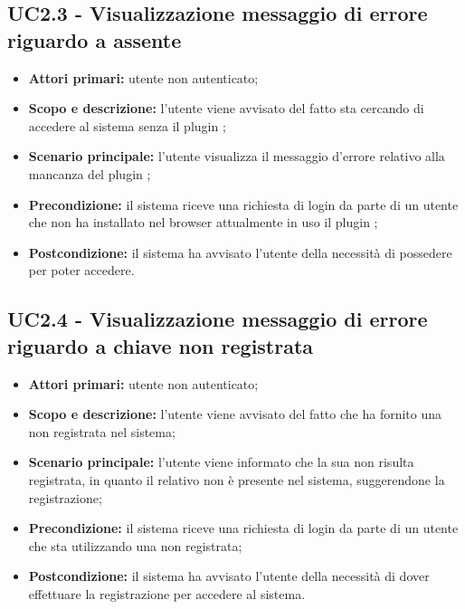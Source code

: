 \documentclass[AnalisiDeiRequisiti.tex]{subfiles}
\begin{document}
\subsection{UC2.3 - Visualizzazione messaggio di errore riguardo a  assente}
\begin{itemize}
	\item \textbf{Attori primari:} utente non autenticato;
	\item \textbf{Scopo e descrizione:} l'utente viene avvisato del fatto sta cercando di accedere al sistema senza il plugin ;
	\item \textbf{Scenario principale:} l'utente visualizza il messaggio d'errore relativo alla mancanza del plugin ;
	\item \textbf{Precondizione:} il sistema riceve una richiesta di login da parte di un utente che non ha installato nel browser attualmente in uso il plugin ;
	\item \textbf{Postcondizione:} il sistema ha avvisato l'utente della necessità di possedere  per poter accedere.
\end{itemize}
\subsection{UC2.4 - Visualizzazione messaggio di errore riguardo a chiave non registrata}
\begin{itemize}
	\item \textbf{Attori primari:} utente non autenticato;
	\item \textbf{Scopo e descrizione:} l'utente viene avvisato del fatto che ha fornito una  non registrata nel sistema;
	\item \textbf{Scenario principale:} l'utente viene informato che la sua  non risulta registrata, in quanto il relativo  non è presente nel sistema, suggerendone la registrazione;
	\item \textbf{Precondizione:} il sistema riceve una richiesta di login da parte di un utente che sta utilizzando una  non registrata;
	\item \textbf{Postcondizione:} il sistema ha avvisato l'utente della necessità di dover effettuare la registrazione per accedere al sistema.
\end{itemize}
\end{document}
